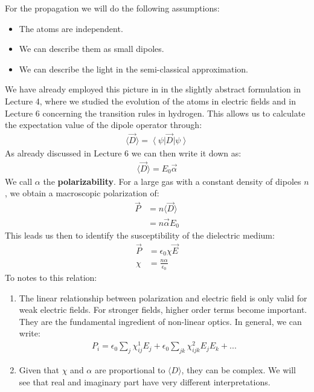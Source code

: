\documentclass[10pt]{article}
\let\cite\citep
\providecommand\citep{\cite}
\newcommand{\bra}[1]{\ensuremath{\left\langle#1\right|}}
\newcommand{\ket}[1]{\ensuremath{\left|#1\right\rangle}}
\begin{document}
For the propagation we will do the following assumptions:
\begin{itemize}
\item The atoms are independent.
\item We can describe them as small dipoles.
\item We can describe the light in the semi-classical approximation.
\end{itemize}
We have already employed this picture in in the slightly abstract formulation in Lecture 4, where we studied the evolution of the atoms in electric fields \cite{Jendrzejewskia} and in Lecture 6 \cite{Jendrzejewski} concerning the transition rules in hydrogen. This allows us to calculate the expectation value of the dipole operator through:
\begin{align}
\langle \vec{D}\rangle = \bra{\psi}\vec{D}\ket{\psi}
\end{align}
As already discussed in Lecture 6 \cite{Jendrzejewski} we can then write it down as:
\begin{align}
\langle \vec{D}\rangle = E_0 \vec{\alpha}
\end{align}
We call $\alpha$ the \textbf{polarizability}. For a large gas with a constant density of dipoles $n$, we obtain a macroscopic polarization of:
\begin{align}
\vec{P} &= n \langle \vec{D}\rangle\\
&= n \vec{\alpha} E_0
\end{align}
This leads us then to identify the susceptibility of the dielectric medium:
\begin{align}\label{Eq:Chi}
\vec{P} &= \epsilon_0 \chi \vec{E}\\
\chi &= \frac{n \alpha}{\epsilon_0}
\end{align}
To notes to this relation:
\begin{enumerate}
\item The linear relationship between polarization and electric field is only valid for weak electric fields. For stronger fields, higher order terms become important. They are the fundamental ingredient of non-linear optics. In general, we can write:
\begin{align}
P_i = \epsilon_0 \sum_{j}\chi_{ij}^{1}E_j+\epsilon_0 \sum_{jk}\chi_{ijk}^{2}E_jE_k + ...
\end{align}
\item Given that $\chi$ and $\alpha$ are proportional to $\langle D \rangle$, they can be complex. We will see that real and imaginary part have very different interpretations.
\end{enumerate}
\end{document}
